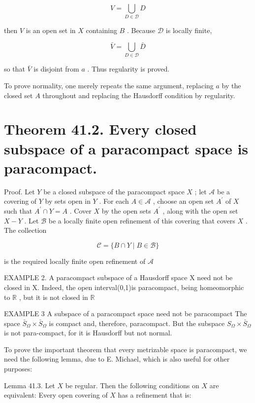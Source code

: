 \[
V = \mathop{\bigcup }\limits_{{D \in  \mathcal{D}}}D
\]

then \(V\) is an open set in \(X\) containing \(B\) . Because \(\mathcal{D}\) is locally finite,

\[
\bar{V} = \mathop{\bigcup }\limits_{{D \in  \mathcal{D}}}\bar{D}
\]

so that \(\bar{V}\) is disjoint from \(a\) . Thus regularity is proved.

To prove normality, one merely repeats the same argument, replacing \(a\) by the closed set \(A\) throughout and replacing the Hausdorff condition by regularity.

\section*{Theorem 41.2. Every closed subspace of a paracompact space is paracompact.}

Proof. Let \(Y\) be a closed subspace of the paracompact space \(X\) ; let \(\mathcal{A}\) be a covering of \(Y\) by sets open in \(Y\) . For each \(A \in  \mathcal{A}\) , choose an open set \({A}^{\prime }\) of \(X\) such that \({A}^{\prime } \cap  Y = A\) . Cover \(X\) by the open sets \({A}^{\prime }\) , along with the open set \(X - Y\) . Let \(\mathcal{B}\) be a locally finite open refinement of this covering that covers \(X\) . The collection

\[
\mathcal{C} = \{ B \cap  Y \mid  B \in  \mathcal{B}\}
\]

is the required locally finite open refinement of \(\mathcal{A}\)

EXAMPLE 2. A paracompact subspace of a Hausdorff space X need not be closed in X. Indeed, the open interval(0,1)is paracompact, being homeomorphic to \(\mathbb{R}\) , but it is not closed in \(\mathbb{R}\)

EXAMPLE 3 A subspace of a paracompact space need not be paracompact The space \({\bar{S}}_{\Omega } \times  {\bar{S}}_{\Omega }\) is compact and, therefore, paracompact. But the subspace \({S}_{\Omega } \times  {\bar{S}}_{\Omega }\) is not para-compact, for it is Hausdorff but not normal.

To prove the important theorem that every metrizable space is paracompact, we need the following lemma, due to E. Michael, which is also useful for other purposes:

Lemma 41.3. Let \(X\) be regular. Then the following conditions on \(X\) are equivalent: Every open covering of \(X\) has a refinement that is:


